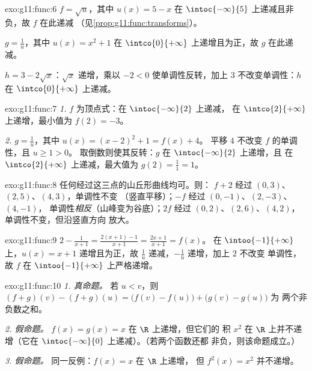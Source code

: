 \begin{solution}{exo:g11:func:6}
$f = \sqrt{u}$，其中 $u(x) = 5 - x$ 在
$\intoc{-\infty}{5}$ 上递减且非负，故 $f$ 在此递减
（见\cref{prop:g11:func:transforms}）。

$g = \frac1u$，其中 $u(x) = x^2 + 1$ 在
$\intco{0}{+\infty}$ 上递增且为正，故 $g$ 在此递减。

$h = 3 - 2\sqrt x$：$\sqrt x$ 递增，乘以 $-2 < 0$
使单调性反转，加上 $3$ 不改变单调性：$h$ 在
$\intco{0}{+\infty}$ 上递减。
\end{solution}

\begin{solution}{exo:g11:func:7}
\emph{1.} $f$ 为顶点式：在 $\intoc{-\infty}{2}$ 上递减，
在 $\intco{2}{+\infty}$ 上递增，最小值为 $f(2) = -3$。

\emph{2.} $g = \frac{1}{u}$，其中 $u(x) = (x-2)^2 + 1 = f(x) + 4$。
平移 $4$ 不改变 $f$ 的单调性，且 $u \geq 1 > 0$。
取倒数则使其反转：$g$ 在 $\intoc{-\infty}{2}$ 上递增，且
在 $\intco{2}{+\infty}$ 上递减，最大值为
$g(2) = \frac{1}{1} = 1$。
\end{solution}

\begin{solution}{exo:g11:func:8}
任何经过这三点的山丘形曲线均可。则：
$f + 2$ 经过 $(0,3)$、$(2,5)$、$(4,3)$，单调性不变
（竖直平移）；$-f$ 经过 $(0,-1)$、$(2,-3)$、$(4,-1)$，
单调性\emph{相反}（山峰变为谷底）；$2f$ 经过
$(0,2)$、$(2,6)$、$(4,2)$，单调性不变，但沿竖直方向
放大。
\end{solution}

\begin{solution}{exo:g11:func:9}
$2 - \frac{1}{x+1} = \frac{2(x+1) - 1}{x+1} = \frac{2x+1}{x+1} = f(x)$。
在 $\intoo{-1}{+\infty}$ 上，$u(x) = x + 1$ 递增且为正，故
$\frac1u$ 递减，$-\frac1u$ 递增，加上 $2$ 不改变
单调性，故 $f$ 在 $\intoo{-1}{+\infty}$ 上严格递增。
\end{solution}

\begin{solution}{exo:g11:func:10}
\emph{1. 真命题。} 若 $u < v$，则
$(f+g)(v) - (f+g)(u) = \bigl(f(v)-f(u)\bigr) + \bigl(g(v)-g(u)\bigr)$ 为
两个非负数之和。

\emph{2. 假命题。} $f(x) = g(x) = x$ 在 $\R$ 上递增，但它们的
积 $x^2$ 在 $\R$ 上并不递增（它在
$\intoc{-\infty}{0}$ 上递减）。（若两个函数还都
非负，则该命题成立。）

\emph{3. 假命题。} 同一反例：$f(x) = x$ 在 $\R$ 上递增，
但 $f^2(x) = x^2$ 并不递增。
\end{solution}

